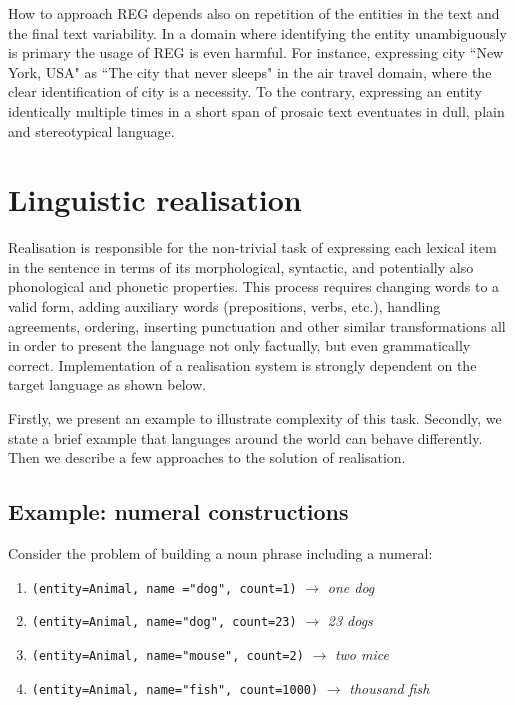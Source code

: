 How to approach REG depends also on repetition of the entities in the text and the final text variability. In a domain where identifying the entity unambiguously is primary the usage of REG is even harmful. For instance, expressing city ``New York, USA" as ``The city that never sleeps" in the air travel domain, where the clear identification of city is a necessity. To the contrary, expressing an entity identically multiple times in a short span of prosaic text eventuates in dull, plain and stereotypical language. 

\section{Linguistic realisation}\label{section:lr}
Realisation is responsible for the non-trivial task of expressing each lexical item in the sentence in terms of its morphological, syntactic, and potentially also phonological and phonetic properties. This process requires changing words to a valid form, adding auxiliary words (prepositions, verbs, etc.), handling agreements, ordering, inserting punctuation and other similar transformations all in order to present the language not only factually, but even grammatically correct. Implementation of a realisation system is strongly dependent on the target language as shown below.

Firstly, we present an example to illustrate complexity of this task. Secondly, we state a brief example that languages around the world can behave differently. Then we describe a few approaches to the solution of realisation. 

\subsection{Example: numeral constructions}
Consider the problem of building a noun phrase including a numeral:
\begin{enumerate}
	\item \texttt{(entity=Animal, name ="dog", count=1)} $\rightarrow$ \emph{one dog} \label{lr-1}
	\item \texttt{(entity=Animal, name="dog", count=23)} $\rightarrow$ \emph{23 dogs} \label{lr-2}
	\item \texttt{(entity=Animal, name="mouse", count=2)} $\rightarrow$ \emph{two mice} \label{lr-3}
	\item \texttt{(entity=Animal, name="fish", count=1000)} $\rightarrow$ \emph{thousand fish} \label{lr-4}
\end{enumerate}

